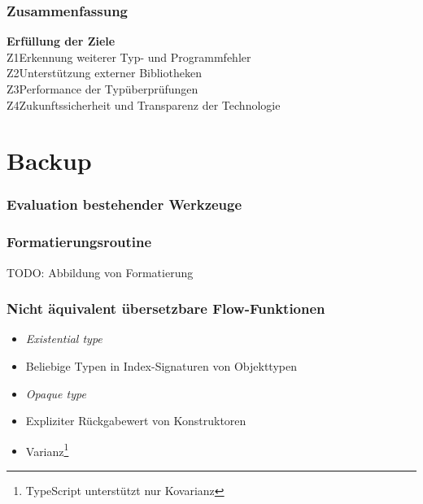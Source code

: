     \begin{frame}
      \frametitle{Zusammenfassung}
      \textbf{Erfüllung der Ziele}\\[1em]
      Z1\hspace{0.75em}Erkennung weiterer Typ- und Programmfehler\\[.6em]
      Z2\hspace{0.75em}Unterstützung externer Bibliotheken\\[.6em]
      Z3\hspace{0.75em}Performance der Typüberprüfungen\\[.6em]
      Z4\hspace{0.75em}Zukunftssicherheit und Transparenz der Technologie
    \end{frame}

  \appendix
    \begin{frame}
    \end{frame}

  \section{Backup}

    \begin{frame}[noframenumbering]
      \frametitle{Evaluation bestehender Werkzeuge}
      
    \end{frame}

    \begin{frame}[noframenumbering]
      \frametitle{Formatierungsroutine}
      TODO: Abbildung von Formatierung
    \end{frame}

    \begin{frame}[noframenumbering]
      \frametitle{Nicht äquivalent übersetzbare Flow-Funktionen}
      \begin{itemize}
        \item \textit{Existential type}
        \item Beliebige Typen in Index-Signaturen von Objekttypen
        \item \textit{Opaque type}
        \item Expliziter Rückgabewert von Konstruktoren
        \item Varianz\footnote{TypeScript unterstützt nur Kovarianz}
      \end{itemize}
    \end{frame}

